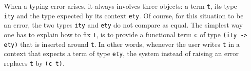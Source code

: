%
%
%


\mcbREQUIRE{}
\mcbPROVIDE{}
\label{sec:coercions}


When a typing error arises, it always involves three objects:
a term \lstinline/t/, its type \lstinline/ity/ and the type
expected by its context \lstinline/ety/.  Of course, for this
situation to be an error, the two types \lstinline/ity/ and
\lstinline/ety/ do not compare as equal.
The simplest way one has to explain \Coq{} how to fix \lstinline/t/,
is to provide a functional term \lstinline/c/ of type
\lstinline/(ity -> ety)/ that is inserted around \lstinline/t/.
In other words, whenever the user writes \lstinline/t/ in a context
that expects a term of type \lstinline/ety/, the system instead of
raising an error replaces \lstinline/t/ by \lstinline/(c t)/.

